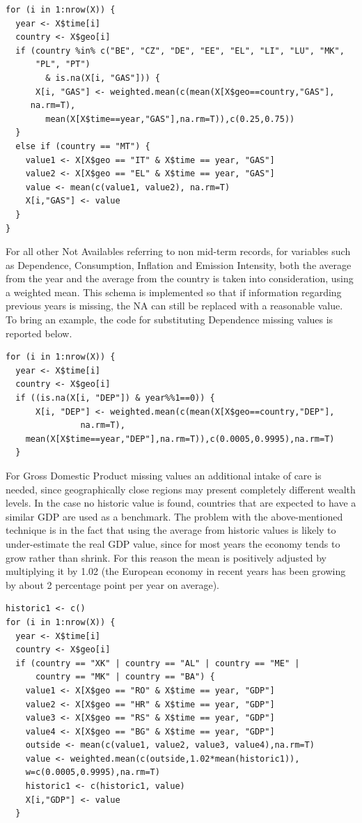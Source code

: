 \documentclass[a4paper,12pt]{book}
\begin{document}
\begin{appendices}
\begin{verbatim}
for (i in 1:nrow(X)) {
  year <- X$time[i]
  country <- X$geo[i]
  if (country %in% c("BE", "CZ", "DE", "EE", "EL", "LI", "LU", "MK",
	  "PL", "PT")
		& is.na(X[i, "GAS"])) {
      X[i, "GAS"] <- weighted.mean(c(mean(X[X$geo==country,"GAS"],
  	 na.rm=T),
		mean(X[X$time==year,"GAS"],na.rm=T)),c(0.25,0.75))
  }
  else if (country == "MT") {
    value1 <- X[X$geo == "IT" & X$time == year, "GAS"]
    value2 <- X[X$geo == "EL" & X$time == year, "GAS"]
    value <- mean(c(value1, value2), na.rm=T)
    X[i,"GAS"] <- value
  }
}
\end{verbatim}

For all other Not Availables referring to non mid-term records, for variables such as Dependence, Consumption, Inflation and Emission Intensity, both the average from the year and the average from the country is taken into consideration, using a weighted mean. This schema is implemented so that if information regarding previous years is missing, the NA can still be replaced with a reasonable value. To bring an example, the code for substituting Dependence missing values is reported below.

\begin{verbatim}
for (i in 1:nrow(X)) {
  year <- X$time[i]
  country <- X$geo[i]
  if ((is.na(X[i, "DEP"]) & year%%1==0)) {
      X[i, "DEP"] <- weighted.mean(c(mean(X[X$geo==country,"DEP"],
	  		   na.rm=T),
	mean(X[X$time==year,"DEP"],na.rm=T)),c(0.0005,0.9995),na.rm=T)
  }
\end{verbatim}

For Gross Domestic Product missing values an additional intake of care is needed, since geographically close regions may present completely different wealth levels. In the case no historic value is found, countries that are expected to have a similar GDP are used as a benchmark. The problem with the above-mentioned technique is in the fact that using the average from historic values is likely to under-estimate the real GDP value, since for most years the economy tends to grow rather than shrink. For this reason the mean is positively adjusted by multiplying it by 1.02 (the European economy in recent years has been growing by about 2 percentage point per year on average).

\begin{verbatim}
historic1 <- c()
for (i in 1:nrow(X)) {
  year <- X$time[i]
  country <- X$geo[i]
  if (country == "XK" | country == "AL" | country == "ME" |
      country == "MK" | country == "BA") {
    value1 <- X[X$geo == "RO" & X$time == year, "GDP"]
    value2 <- X[X$geo == "HR" & X$time == year, "GDP"]
    value3 <- X[X$geo == "RS" & X$time == year, "GDP"]
    value4 <- X[X$geo == "BG" & X$time == year, "GDP"]
    outside <- mean(c(value1, value2, value3, value4),na.rm=T)
    value <- weighted.mean(c(outside,1.02*mean(historic1)),
    w=c(0.0005,0.9995),na.rm=T)
    historic1 <- c(historic1, value)
    X[i,"GDP"] <- value
  }
\end{verbatim}


\end{appendices}
\end{document}
